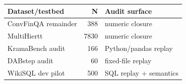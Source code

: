 \begin{tabular}{lrl}
\toprule
Dataset/testbed & N & Audit surface \\
\midrule
ConvFinQA remainder & 388 & numeric closure \\
MultiHiertt & 7830 & numeric closure \\
KramaBench audit & 166 & Python/pandas replay \\
DABstep audit & 60 & fixed-file replay \\
WikiSQL dev pilot & 500 & SQL replay + semantics \\
\bottomrule
\end{tabular}
